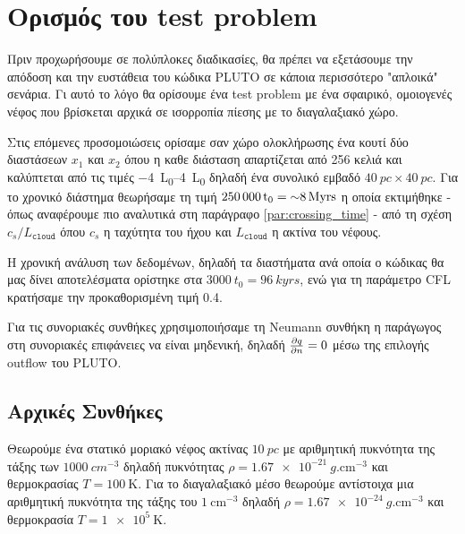 	\section{Ορισμός του test problem}
	Πριν προχωρήσουμε σε πολύπλοκες διαδικασίες, θα πρέπει να εξετάσουμε την απόδοση και την ευστάθεια του κώδικα PLUTO σε κάποια περισσότερο "απλοικά" σενάρια. Γι αυτό το λόγο θα ορίσουμε ένα test problem με ένα σφαιρικό, ομοιογενές νέφος που βρίσκεται αρχικά σε ισορροπία πίεσης με το διαγαλαξιακό χώρο. 
	
	Στις επόμενες προσομοιώσεις ορίσαμε σαν χώρο ολοκλήρωσης ένα κουτί δύο διαστάσεων $x_1$ και $x_2$ όπου η καθε διάσταση απαρτίζεται από 256 κελιά και καλύπτεται από τις τιμές \SIrange{-4}{4}{L_0} δηλαδή ένα συνολικό εμβαδό $\SI{40}{pc}\times \SI{40}{pc}$. Για το χρονικό διάστημα θεωρήσαμε τη τιμή $\SI{250000}{t_0}=\SI{~8}{Myrs}$ η οποία εκτιμήθηκε - όπως αναφέρουμε πιο αναλυτικά στη παράγραφο \ref{par:crossing_time} - από τη σχέση $c_s/L_\mathtt{cloud}$ όπου $c_s$ η ταχύτητα του ήχου και $L_\mathtt{cloud}$ η ακτίνα του νέφους. 
	
	Η χρονική ανάλυση των δεδομένων, δηλαδή τα διαστήματα ανά οποία ο κώδικας θα μας δίνει αποτελέσματα ορίστηκε στα $\SI{3000}{t_0}=\SI{96}{kyrs}$, ενώ για τη παράμετρο CFL κρατήσαμε την προκαθορισμένη τιμή \num{0.4}. 
	
	Για τις συνοριακές συνθήκες χρησιμοποιήσαμε τη Neumann συνθήκη η παράγωγος στη συνοριακές επιφάνειες να είναι μηδενική, δηλαδή $\pdv{q}{n}=0$ μέσω της επιλογής outflow του PLUTO.
	
	\subsection{Αρχικές Συνθήκες}
	\label{par:InitialConditions}
	Θεωρούμε ένα στατικό μοριακό νέφος ακτίνας $\SI{10} {pc}$ με αριθμητική πυκνότητα
	της τάξης των $\SI{1000}{cm^{-3}}$ δηλαδή πυκνότητας $\rho=\SI{1.67e-21}{g. \cm^{-3}}$ και θερμοκρασίας $T=\SI{100}{\kelvin}$.
	Για το διαγαλαξιακό μέσο θεωρούμε αντίστοιχα μια αριθμητική πυκνότητα της τάξης του 
	$\SI{1}{\cm^{-3}}$ δηλαδή $\rho=\SI{1.67e-24}{g. \cm^{-3}}$ και θερμοκρασία $T=\SI{1e5}{\kelvin}$.

